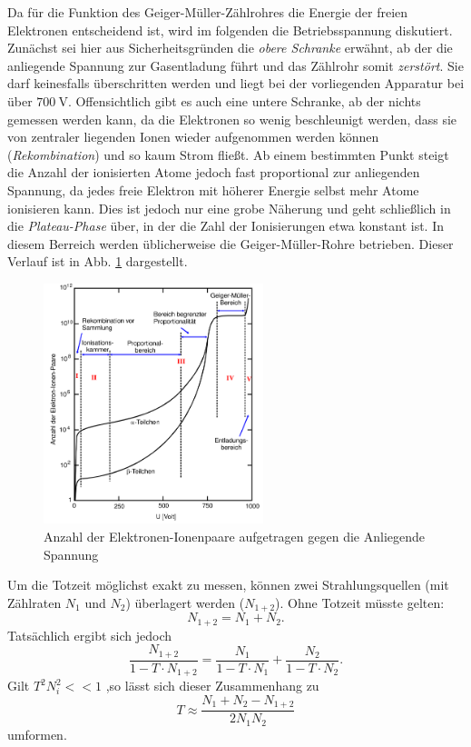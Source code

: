 Da für die Funktion des Geiger-Müller-Zählrohres die Energie der freien Elektronen entscheidend ist, wird im folgenden die Betriebsspannung diskutiert. Zunächst sei hier aus Sicherheitsgründen die \textit{obere Schranke} erwähnt, ab der die anliegende Spannung zur Gasentladung führt und das Zählrohr somit \textit{zerstört}. Sie darf keinesfalls überschritten werden und liegt bei der vorliegenden Apparatur bei über $\SI{700}{\volt}$. Offensichtlich gibt es auch eine untere Schranke, ab der nichts gemessen werden kann, da die Elektronen so wenig beschleunigt werden, dass sie von zentraler liegenden Ionen wieder aufgenommen werden können (\textit{Rekombination}) und so kaum Strom fließt. Ab einem bestimmten Punkt steigt die Anzahl der ionisierten Atome jedoch fast proportional zur anliegenden Spannung, da jedes freie Elektron mit höherer Energie selbst mehr Atome ionisieren kann. Dies ist jedoch nur eine grobe Näherung und geht schließlich in die \textit{Plateau-Phase} über, in der die Zahl der Ionisierungen etwa konstant ist. In diesem Berreich werden üblicherweise die Geiger-Müller-Rohre betrieben. Dieser Verlauf ist in Abb. \ref{fig:GM-Kurve} dargestellt.

\begin{figure}
  \centering
  \includegraphics[height = 7cm]{./logos/GM-Kurve.PNG}
  \caption{Anzahl der Elektronen-Ionenpaare aufgetragen gegen die Anliegende Spannung \cite{Anleitung}}
  \label{fig:GM-Kurve}
\end{figure}

Um die Totzeit möglichst exakt zu messen, können zwei Strahlungsquellen (mit Zählraten $N_1$ und $N_2$) überlagert werden ($N_{1+2}$). Ohne Totzeit müsste gelten:
\begin{equation*}
  N_{1+2} = N_1 + N_2.
\end{equation*}
Tatsächlich ergibt sich jedoch
\begin{equation}
  \frac{N_{1+2}}{1- T\cdot N_{1+2}} = \frac{N_1}{1-T\cdot N_1} + \frac{N_2}{1-T\cdot N_2}.
  \label{eqn:2Quellen}
\end{equation}
Gilt $T^2N_i^2<<1$ ,so lässt sich dieser Zusammenhang zu
\begin{equation}
  T \approx \frac{N_1+N_2-N_{1+2}}{2N_1 N_2}
  \label{eqn:easy}
\end{equation}
umformen.
